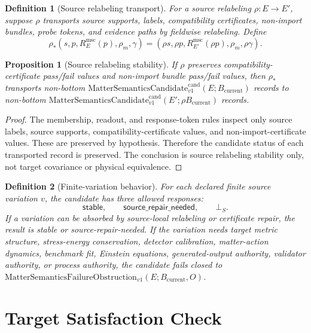 \documentclass[11pt]{article}
\newcommand{\Bcur}{B_{\mathrm{current}}}
\newcommand{\FailureObs}{\mathrm{MatterSemanticsFailureObstruction}_{v1}}
\newcommand{\MSCand}{\mathrm{MatterSemanticsCandidate}^{\mathrm{cand}}_{v1}}
\newcommand{\BottomS}{\bot_S}
\newtheorem{definition}{Definition}
\newtheorem{proposition}{Proposition}
\begin{document}
\begin{definition}[Source relabeling transport]
For a source relabeling \(\rho:E\to E'\), suppose \(\rho\) transports source
supports, labels, compatibility certificates, non-import bundles, probe
tokens, and evidence paths by fieldwise relabeling. Define
\[
  \rho_*(s,p,R_E^{\mathrm{msc}}(p),\rho_m,\gamma)
  =
  (\rho s,\rho p,R_{E'}^{\mathrm{msc}}(\rho p),\rho_m,\rho\gamma).
\]
\end{definition}

\begin{proposition}[Source relabeling stability]
If \(\rho\) preserves compatibility-certificate pass/fail values and
non-import bundle pass/fail values, then \(\rho_*\) transports non-bottom
\(\MSCand(E;\Bcur)\) records to non-bottom \(\MSCand(E';\rho\Bcur)\) records.
\end{proposition}

\begin{proof}
The membership, readout, and response-token rules inspect only source labels,
source supports, compatibility-certificate values, and non-import-certificate
values. These are preserved by hypothesis. Therefore the candidate status of
each transported record is preserved. The conclusion is source relabeling
stability only, not target covariance or physical equivalence.
\end{proof}

\begin{definition}[Finite-variation behavior]
For each declared finite source variation \(v\), the candidate has three
allowed responses:
\[
  \mathsf{stable},\qquad \mathsf{source\_repair\_needed},\qquad \BottomS.
\]
If a variation can be absorbed by source-local relabeling or certificate
repair, the result is stable or source-repair-needed. If the variation needs
target metric structure, stress-energy conservation, detector calibration,
matter-action dynamics, benchmark fit, Einstein equations, generated-output
authority, validator authority, or process authority, the candidate fails
closed to \(\FailureObs(E;\Bcur,O)\).
\end{definition}

\section{Target Satisfaction Check}
\end{document}
